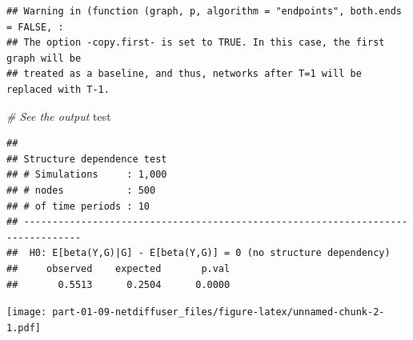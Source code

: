 \documentclass[
]{book}
\newenvironment{Shaded}{\begin{snugshade}}{\end{snugshade}}
\newcommand{\CommentTok}[1]{\textcolor[rgb]{0.56,0.35,0.01}{\textit{#1}}}
\newcommand{\NormalTok}[1]{#1}
\begin{document}
\begin{itemize}
\begin{verbatim}
## Warning in (function (graph, p, algorithm = "endpoints", both.ends = FALSE, :
## The option -copy.first- is set to TRUE. In this case, the first graph will be
## treated as a baseline, and thus, networks after T=1 will be replaced with T-1.
\end{verbatim}

\begin{Shaded}
\begin{Highlighting}[]
\CommentTok{\# See the output}
\NormalTok{test}
\end{Highlighting}
\end{Shaded}

\begin{verbatim}
## 
## Structure dependence test
## # Simulations     : 1,000
## # nodes           : 500
## # of time periods : 10
## --------------------------------------------------------------------------------
##  H0: E[beta(Y,G)|G] - E[beta(Y,G)] = 0 (no structure dependency)
##     observed    expected       p.val
##       0.5513      0.2504      0.0000
\end{verbatim}
\end{itemize}

\texttt{[image: part-01-09-netdiffuser\_files/figure-latex/unnamed-chunk-2-1.pdf]}
\end{document}
